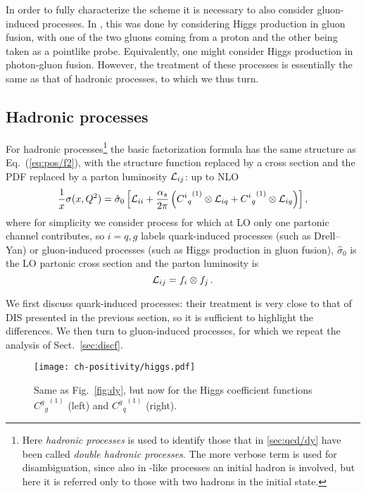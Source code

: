 In order to fully characterize the scheme it is necessary to also consider
gluon-induced processes. 
In \cite{Altarelli:1998gn}, this was done by considering Higgs production in
gluon fusion, with one of the two gluons coming from a proton and the other
being taken as a pointlike probe.
Equivalently, one might consider Higgs production in photon-gluon fusion.
However, the treatment of these processes is essentially the same as that of
hadronic processes, to which we thus turn.


\subsection{Hadronic processes}
\label{sec:hadr}
For hadronic processes\footnote{
  Here \textit{hadronic processes} is used to identify those that in
  \cref{sec:qcd/dy} have been called \textit{double hadronic processes}.
  The more verbose term is used for disambiguation, since also in \dis-like
  processes an initial hadron is involved, but here it is referred only to
  those with two hadrons in the initial state.
} the basic factorization formula has the same structure
as Eq.~(\ref{eq:pos/f2}), with the structure function replaced by a cross section
and the PDF replaced by a parton luminosity ${\cal L}_{ij}$: up to NLO
\begin{equation}
 \frac{1}{x} \sigma(x,Q^2)= \hat \sigma_0 \left[  {\cal L}_{ii}
   +\frac{\alpha_s}{2\pi}\left( {{C^i}_q}^{(1)} \otimes {\cal L}_{iq} +
 {{C^i}_g}^{(1)} \otimes {\cal L}_{ig}\right) \right],\label{eq:pos/hadfact}
\end{equation}
where for simplicity we consider process for which at LO only one
partonic channel contributes, so
$i=q,g$ labels quark-induced processes (such as Drell--Yan) or
gluon-induced processes (such as Higgs production in gluon fusion),
$\hat{\sigma}_0$ is the LO partonic cross section and
the parton luminosity is 
\begin{equation}\label{eq:pos/lumi}
 {\cal L}_{ij}= f_i\otimes f_j\,.
\end{equation}

We first discuss quark-induced processes: their treatment is very close to that
of DIS  presented in the previous section, so it is sufficient to highlight the
differences.
We then turn to gluon-induced processes, for which we repeat the analysis of
Sect.~\ref{sec:discf}.


\begin{figure}[t]
  \begin{center}
    \texttt{[image: ch-positivity/higgs.pdf]}
    \caption{\small Same as Fig.~\ref{fig:dy}, but now for the Higgs
      coefficient functions  ${{{C^g}_g}^{(1)}}$ (left) and
      ${{{C^g}_q}^{(1)}}$ (right).
    \label{fig:higgs} }
  \end{center}
\end{figure}


